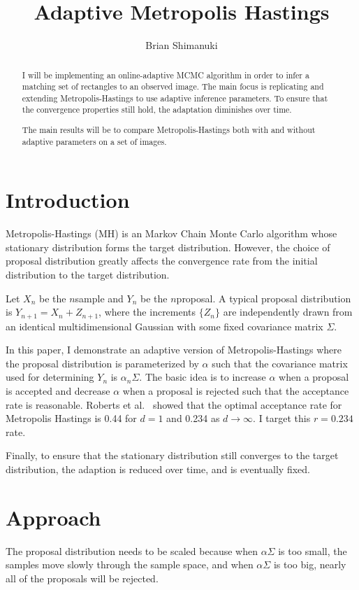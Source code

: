 \documentclass{article}
\title{Adaptive Metropolis Hastings}
\author{Brian Shimanuki}
\begin{document}
\maketitle

\begin{abstract}

I will be implementing an online-adaptive MCMC algorithm in order to infer a matching set of rectangles to an observed image. The main focus is replicating \cite{dippl} and extending Metropolis-Hastings to use adaptive inference parameters. To ensure that the convergence properties still hold, the adaptation diminishes over time.

The main results will be to compare Metropolis-Hastings both with and without adaptive parameters on a set of images.

\end{abstract}

\section{Introduction}
Metropolis-Hastings\cite{metropolis,hastings} (MH) is an Markov Chain Monte Carlo algorithm whose stationary distribution forms the target distribution. However, the choice of proposal distribution greatly affects the convergence rate from the initial distribution to the target distribution.

Let $X_n$ be the $n$\th sample and $Y_n$ be the $n$\th proposal. A typical proposal distribution is $Y_{n+1}=X_{n}+Z_{n+1}$, where the increments $\{Z_n\}$ are independently drawn from an identical multidimensional Gaussian with some fixed covariance matrix $\Sigma$.

In this paper, I demonstrate an adaptive version of Metropolis-Hastings where the proposal distribution is parameterized by $\alpha$ such that the covariance matrix used for determining $Y_n$ is $\alpha_n\Sigma$. The basic idea is to increase $\alpha$ when a proposal is accepted and decrease $\alpha$ when a proposal is rejected such that the acceptance rate is reasonable. Roberts et al.\ \cite{roberts} showed that the optimal acceptance rate for Metropolis Hastings is 0.44 for $d=1$ and 0.234 as $d\to\infty$. I target this $r=0.234$ rate.

Finally, to ensure that the stationary distribution still converges to the target distribution, the adaption is reduced over time, and is eventually fixed.

\section{Approach}
The proposal distribution needs to be scaled because when $\alpha\Sigma$ is too small, the samples move slowly through the sample space, and when $\alpha\Sigma$ is too big, nearly all of the proposals will be rejected.
\end{document}
